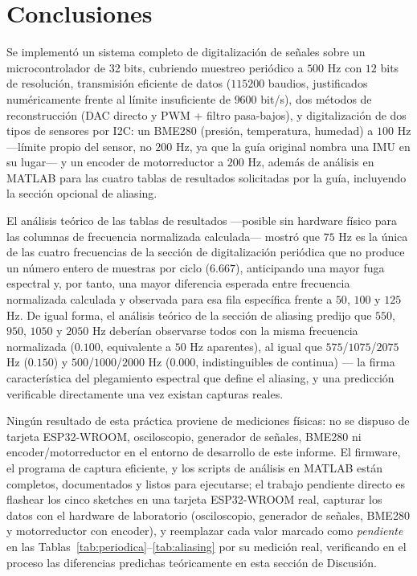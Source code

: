 
\section{Conclusiones}

Se implementó un sistema completo de digitalización de señales sobre un microcontrolador de 32 bits, cubriendo muestreo periódico a $500$ Hz con $12$ bits de resolución, transmisión eficiente de datos ($115200$ baudios, justificados numéricamente frente al límite insuficiente de $9600$ bit/s), dos métodos de reconstrucción (DAC directo y PWM + filtro pasa-bajos), y digitalización de dos tipos de sensores por I2C: un BME280 (presión, temperatura, humedad) a $100$ Hz —límite propio del sensor, no $200$ Hz, ya que la guía original nombra una IMU en su lugar— y un encoder de motorreductor a $200$ Hz, además de análisis en MATLAB para las cuatro tablas de resultados solicitadas por la guía, incluyendo la sección opcional de aliasing.

El análisis teórico de las tablas de resultados —posible sin hardware físico para las columnas de frecuencia normalizada calculada— mostró que $75$ Hz es la única de las cuatro frecuencias de la sección de digitalización periódica que no produce un número entero de muestras por ciclo ($6.667$), anticipando una mayor fuga espectral y, por tanto, una mayor diferencia esperada entre frecuencia normalizada calculada y observada para esa fila específica frente a $50$, $100$ y $125$ Hz. De igual forma, el análisis teórico de la sección de aliasing predijo que $550$, $950$, $1050$ y $2050$ Hz deberían observarse todos con la misma frecuencia normalizada ($0.100$, equivalente a $50$ Hz aparentes), al igual que $575$/$1075$/$2075$ Hz ($0.150$) y $500$/$1000$/$2000$ Hz ($0.000$, indistinguibles de continua) — la firma característica del plegamiento espectral que define el aliasing, y una predicción verificable directamente una vez existan capturas reales.

Ningún resultado de esta práctica proviene de mediciones físicas: no se dispuso de tarjeta ESP32-WROOM, osciloscopio, generador de señales, BME280 ni encoder/motorreductor en el entorno de desarrollo de este informe. El firmware, el programa de captura eficiente, y los scripts de análisis en MATLAB están completos, documentados y listos para ejecutarse; el trabajo pendiente directo es flashear los cinco sketches en una tarjeta ESP32-WROOM real, capturar los datos con el hardware de laboratorio (osciloscopio, generador de señales, BME280 y motorreductor con encoder), y reemplazar cada valor marcado como \emph{pendiente} en las Tablas~\ref{tab:periodica}–\ref{tab:aliasing} por su medición real, verificando en el proceso las diferencias predichas teóricamente en esta sección de Discusión.
